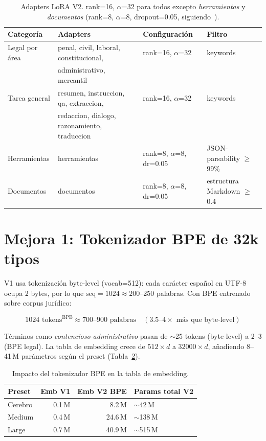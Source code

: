 \documentclass[11pt,a4paper]{article}
\begin{document}
\begin{table}[h]
\centering
\caption{Adapters LoRA V2. rank=16, $\alpha$=32 para todos excepto \textit{herramientas} y \textit{documentos}
(rank=8, $\alpha$=8, dropout=0.05, siguiendo~\citep{salesforce2025xlam}).}
\label{tab:loras}
\begin{tabular}{llll}
\toprule
\textbf{Categoría} & \textbf{Adapters} & \textbf{Configuración} & \textbf{Filtro} \\
\midrule
Legal por área  & penal, civil, laboral, constitucional, & rank=16, $\alpha$=32 & keywords \\
                & administrativo, mercantil & & \\
Tarea general   & resumen, instruccion, qa, extraccion, & rank=16, $\alpha$=32 & keywords \\
                & redaccion, dialogo, razonamiento, traduccion & & \\
Herramientas    & herramientas & rank=8, $\alpha$=8, dr=0.05 & JSON-parsability $\geq$99\% \\
Documentos      & documentos & rank=8, $\alpha$=8, dr=0.05 & estructura Markdown $\geq$0.4 \\
\bottomrule
\end{tabular}
\end{table}

\section{Mejora 1: Tokenizador BPE de 32k tipos}
\label{sec:bpe}

V1 usa tokenización byte-level (vocab=512): cada carácter español en UTF-8 ocupa
2 bytes, por lo que $\text{seq}=1024 \approx 200$--250 palabras. Con BPE entrenado
sobre corpus jurídico:

\begin{equation}
  1024 \text{ tokens}^{\text{BPE}} \approx 700\text{--}900 \text{ palabras} \quad
  (3.5\text{--}4\times \text{ más que byte-level})
\end{equation}

Términos como \textit{contencioso-administrativo} pasan de $\sim$25 tokens (byte-level)
a 2--3 (BPE legal). La tabla de embedding crece de $512 \times d$ a $32000 \times d$,
añadiendo 8--41\,M parámetros según el preset (Tabla~\ref{tab:emb}).

\begin{table}[h]
\centering
\caption{Impacto del tokenizador BPE en la tabla de embedding.}
\label{tab:emb}
\begin{tabular}{lrrl}
\toprule
\textbf{Preset} & \textbf{Emb V1} & \textbf{Emb V2 BPE} & \textbf{Params total V2} \\
\midrule
Cerebro  & 0.1\,M & 8.2\,M  & $\sim$42\,M  \\
Medium   & 0.4\,M & 24.6\,M & $\sim$138\,M \\
Large    & 0.7\,M & 40.9\,M & $\sim$515\,M \\
\bottomrule
\end{tabular}
\end{table}
\end{document}
